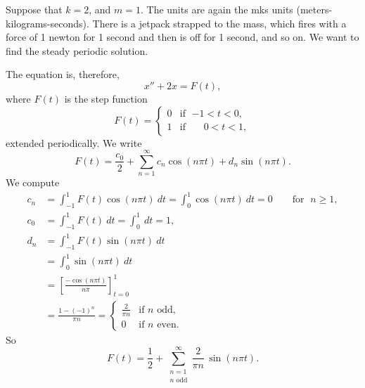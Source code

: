 \begin{example} \label{afs:steadyex}
Suppose that $k=2$, and $m=1$.
The units are again the mks units
(meters-kilograms-seconds).
There is a jetpack strapped to the mass, which fires with a force of 1
newton for 1
second and then is off for 1 second, and so on.  We want to find the steady periodic
solution.

The equation is, therefore,
\begin{equation*}
x'' + 2 x = F(t) ,
\end{equation*}
where $F(t)$ is the step function
\begin{equation*}
F(t) =
\begin{cases}
0 & \text{if } \; {-1} < t < 0 , \\
1 & \text{if } \; \phantom{-}0 < t < 1 ,
\end{cases}
\end{equation*}
extended periodically.
We write
\begin{equation*}
F(t) = \frac{c_0}{2} + \sum_{n=1}^\infty
c_n \cos (n \pi t) +
d_n \sin (n \pi t) .
\end{equation*}
We compute
\begin{align*}
c_n & = \int_{-1}^1 F(t) \cos (n \pi t) ~ dt = 
\int_{0}^1 \cos (n \pi t) ~ dt = 0 \qquad \text{for } \; n \geq 1,
\\
c_0 & = \int_{-1}^1 F(t) ~ dt = 
\int_{0}^1 ~ dt = 1 ,
\\
d_n & = \int_{-1}^1 F(t) \sin (n \pi t) ~ dt
\\
& = \int_{0}^1 \sin (n \pi t) ~ dt
\\
& = \left[ \frac{-\cos (n \pi t)}{n \pi} \right]_{t=0}^1
\\
& = \frac{1-{(-1)}^n}{\pi n} =
\begin{cases}
\frac{2}{\pi n} & \text{if } n \text{ odd} , \\
0 & \text{if } n \text{ even} .
\end{cases}
\end{align*}
So
\begin{equation*}
F(t) = \frac{1}{2} + \sum_{\substack{n=1 \\ n \text{ odd}}}^\infty
\frac{2}{\pi n} \, \sin (n \pi t) .
\end{equation*}


\end{example}
